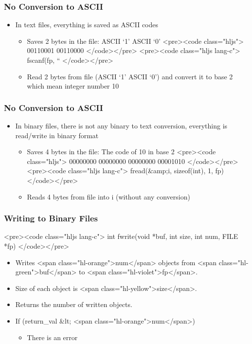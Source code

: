 \documentclass{../c-lecture}
\begin{document}
\begin{frame}
  \begin{frame}
    \frametitle{No Conversion to ASCII}
    \begin{itemize}
      \item In text files, everything is saved as ASCII codes
      \begin{itemize}
        <pre><code class="hljs lang-c">
fprintf(fp, “%
        </code></pre>
        \item Saves 2 bytes in the file: ASCII ‘1’ ASCII ‘0’
        <pre><code class="hljs">
00110001 00110000
        </code></pre>
        <pre><code class="hljs lang-c">
fscanf(fp, “%
        </code></pre>
        \item
          Read 2 bytes from file (ASCII ‘1’ ASCII ‘0’) and convert it to base 2
          which mean integer number 10

      \end{itemize}
    \end{itemize}
  \end{frame}
  \begin{frame}
    \frametitle{No Conversion to ASCII}
    \begin{itemize}
      \item
        In binary files, there is not any binary to text conversion, everything
        is read/write in binary format

      \begin{itemize}
        <pre><code class="hljs lang-c">
int i = 10;
fwrite(&amp;i, sizeof(int), 1, fp)
        </code></pre>
        \item Saves 4 bytes in the file: The code of 10 in base 2
        <pre><code class="hljs">
00000000 00000000 00000000 00001010
        </code></pre>
        <pre><code class="hljs lang-c">
fread(&amp;i, sizeof(int), 1, fp)
        </code></pre>
        \item Reads 4 bytes from file into i (without any conversion)
      \end{itemize}
    \end{itemize}
  \end{frame}
\end{frame}
\begin{frame}
  \frametitle{Writing to Binary Files}
  <pre><code class="hljs lang-c">
int fwrite(void *buf, int size, int num, FILE *fp)
  </code></pre>
  \begin{itemize}
    \item
      Writes <span class="hl-orange">num</span> objects from
      <span class="hl-green">buf</span> to <span class="hl-violet">fp</span>.

    \item Size of each object is <span class="hl-yellow">size</span>.
    \item Returns the number of written objects.
    \item If (return_val &lt; <span class="hl-orange">num</span>)
    \begin{itemize}
      \item There is an error
    \end{itemize}
  \end{itemize}
\end{frame}
\end{document}
